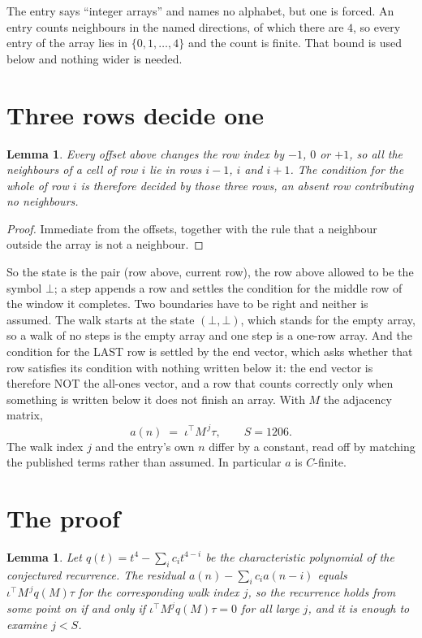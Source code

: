 \documentclass[11pt,a4paper]{article}
\theoremstyle{plain}
\newtheorem{lemma}[theorem]{Lemma}
\theoremstyle{definition}
\begin{document}
The entry says ``integer arrays'' and names no alphabet, but one is forced. An entry counts
neighbours in the named directions, of which there are $4$, so every entry of the array
lies in $\{0,1,\dots,4\}$ and the count is finite. That bound is used below and
nothing wider is needed.

\section{Three rows decide one}

\begin{lemma}\label{lem:win}
Every offset above changes the row index by $-1$, $0$ or $+1$, so all the neighbours of a cell
of row $i$ lie in rows $i-1$, $i$ and $i+1$. The condition for the whole of row $i$ is
therefore decided by those three rows, an absent row contributing no neighbours.
\end{lemma}

\begin{proof}
Immediate from the offsets, together with the rule that a neighbour outside the array is not a
neighbour.
\end{proof}

So the state is the pair (row above, current row), the row above allowed to be the symbol
$\bot$; a step appends a row and settles the condition for the middle row of the window it
completes. Two boundaries have to be right and neither is assumed. The walk starts at the state
$(\bot,\bot)$, which stands for the empty array, so a walk of no steps is the empty array and
one step is a one-row array. And the condition for the LAST row is settled by the end vector,
which asks whether that row satisfies its condition with nothing written below it: the end
vector is therefore NOT the all-ones vector, and a row that counts correctly only when
something is written below it does not finish an array. With $M$ the adjacency matrix,
\[
a(n)\;=\;\iota^{\!\top}M^{\,j}\tau ,\qquad S=1206.
\]
The walk index $j$ and the entry's own $n$ differ by a constant, read off by matching the
published terms rather than assumed. In particular $a$ is $C$-finite.

\section{The proof}

\begin{lemma}\label{lem:crit}
Let $q(t)=t^{4}-\sum_i c_it^{4-i}$ be the characteristic polynomial of the
conjectured recurrence. The residual $a(n)-\sum_ic_ia(n-i)$ equals
$\iota^{\!\top}M^{\,j}q(M)\tau$ for the corresponding walk index $j$, so the recurrence
holds from some point on if and only if $\iota^{\!\top}M^{j}q(M)\tau=0$ for all large $j$,
and it is enough to examine $j<S$.
\end{lemma}
\end{document}

